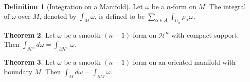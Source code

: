 \documentclass[]{article}
\theoremstyle{definition}
\newtheorem{theorem}{Theorem}[section] %
\theoremstyle{definition}
\newtheorem{definition}[theorem]{Definition} %
\begin{document}
\begin{definition}[Integration on a Manifold]
    Let $\omega$ be a $n$-form on $M$. The integral of $\omega$ over $M$, denoted by $\int_M \omega$, is defined to be $\sum_{\alpha\in A}\int_{U_\alpha}\rho_\alpha\omega$.
\end{definition}

\begin{theorem}
    Let $\omega$ be a smooth $(n-1)$-form on $\mathcal{H}^n$ with compact support. Then $\int_{\mathcal{H}^n}d\omega=\int_{\partial \mathcal{H}^n}\omega$.
\end{theorem}

\begin{theorem}
    Let $\omega$ be a smooth $(n-1)$-form on an oriented manifold with boundary $M$. Then $\int_{M}d\omega=\int_{\partial M}\omega$.
\end{theorem}
\end{document}
